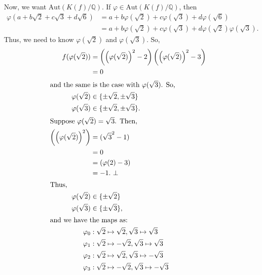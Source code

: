 \documentclass[10pt]{extarticle}
\newcommand{\Q}{\mathbb{Q}}
\begin{document}
  Now, we want $\text{Aut}(K(f)/\Q)$. If $\varphi\in \text{Aut}(K(f)/\Q)$, then
  \begin{align*}
    \varphi(a+b\sqrt{2}+c\sqrt{3}+d\sqrt{6}) &= a+b\varphi(\sqrt{2}) + c\varphi(\sqrt{3}) + d\varphi(\sqrt{6})\\
                                             &= a+b\varphi(\sqrt{2}) + c\varphi(\sqrt{3}) + d\varphi(\sqrt{2})\varphi(\sqrt{3}).
  \end{align*}
  Thus, we need to know $\varphi(\sqrt{2})$ and $\varphi(\sqrt{3})$. So,
  \begin{align*}
    f(\varphi(\sqrt{2})) &= \left(\left(\varphi(\sqrt{2})\right)^2 - 2\right)\left(\left(\varphi(\sqrt{2})\right)^2-3\right)\\
                         &= 0\\
                         \shortintertext{and the same is the case with $\varphi(\sqrt{3})$. So,}
    \varphi(\sqrt{2}) &\in \{\pm\sqrt{2}, \pm\sqrt{3}\}\\
    \varphi(\sqrt{3}) &\in \{\pm\sqrt{2},\pm\sqrt{3}\}.\\
    \shortintertext{Suppose $\varphi(\sqrt{2}) = \sqrt{3}$. Then,}
    \left(\left(\varphi(\sqrt{2})\right)^2\right) &= (\sqrt{3}^2-1)\\
                                                  &= 0\\
                                                  &=\left(\varphi(2)-3\right)\\
                                                  &= -1.~\bot\\
                                                  \shortintertext{Thus,}
    \varphi(\sqrt{2}) &\in \{\pm\sqrt{2}\}\\
    \varphi(\sqrt{3}) &\in \{\pm\sqrt{3}\},\\
    \shortintertext{and we have the maps as:}
    \varphi_0&: \sqrt{2}\mapsto\sqrt{2},\sqrt{3}\mapsto\sqrt{3}\\
    \varphi_1&: \sqrt{2}\mapsto-\sqrt{2},\sqrt{3}\mapsto\sqrt{3}\\
    \varphi_2&: \sqrt{2}\mapsto\sqrt{2},\sqrt{3}\mapsto-\sqrt{3}\\
    \varphi_3&: \sqrt{2}\mapsto-\sqrt{2},\sqrt{3}\mapsto-\sqrt{3}\\
  \end{align*}
\end{document}
